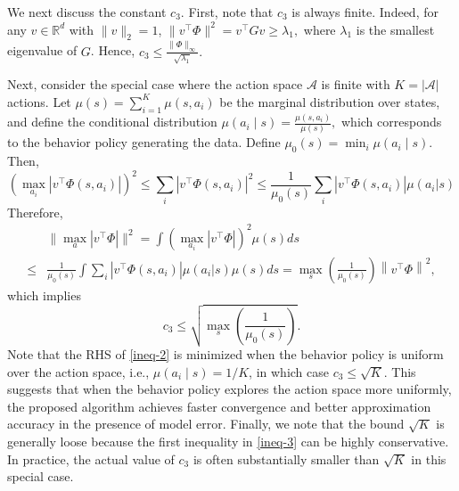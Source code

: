 \documentclass[12pt]{article}
\def\l{\left}
\def\r{\right}
\def\ll{\left\lVert}
\def\rl{\right\rVert}
\begin{document}
We next discuss the constant $c_3$. First, note that $c_3$ is always finite. Indeed, for any $v\in\mathbb R^d$ with $\|v\|_2=1$, $\|v^\top \Phi\|^2 = v^\top G v \ge \lambda_1,$ where $\lambda_1$ is the smallest eigenvalue of $G$. Hence, $c_3 \le \frac{\|\Phi\|_\infty}{\sqrt{\lambda_1}}.$

Next, consider the special case where the action space $\mathcal A$ is finite with $K=|\mathcal A|$ actions. Let
$\mu(s)=\sum_{i=1}^K \mu(s,a_i)$ be the marginal distribution over states, and define the conditional distribution $\mu(a_i\mid s)=\frac{\mu(s,a_i)}{\mu(s)},$
which corresponds to the behavior policy generating the data. Define $\mu_0(s)=\min_i \mu(a_i\mid s).$ Then,
\begin{equation}\label{ineq-3}
\l(\max_{a_i} | v^\top \Phi(s,a_i) |\r)^2 \leq \sum_i | v^\top \Phi(s,a_i) |^2 \leq \frac{1}{\mu_0(s)}\sum_i | v^\top \Phi(s,a_i) | \mu(a_i|s)    
\end{equation}
Therefore,
\[
\begin{aligned}
&\|\max_a |v^\top \Phi|\|^2 = \int \l(\max_{a_i} | v^\top \Phi |\r)^2 \mu(s) ds \\
\leq& \frac{1}{\mu_0(s)} \int \sum_i | v^\top \Phi(s,a_i) | \mu(a_i|s)\mu(s) ds = \max_s\l(\frac{1}{\mu_0(s)}\r) \ll v^\top \Phi \rl^2   , 
\end{aligned}
\]
which implies 
\begin{equation}\label{ineq-2}
    c_3\leq \sqrt{\max_s\l(\frac{1}{\mu_0(s)}\r)}.
\end{equation} 
Note that the RHS of \eqref{ineq-2} is minimized when the behavior policy is uniform over the action space, i.e., $\mu(a_i\mid s)=1/K$, in which case $c_3 \leq \sqrt{K}$. %
This suggests that when the behavior policy explores the action space more uniformly, the proposed algorithm achieves faster convergence and better approximation accuracy in the presence of model error. Finally, we note that the bound $\sqrt{K}$ is generally loose because the first inequality in \eqref{ineq-3} can be highly conservative. In practice, the actual value of $c_3$ is often substantially smaller than $\sqrt{K}$ in this special case.
\end{document}
